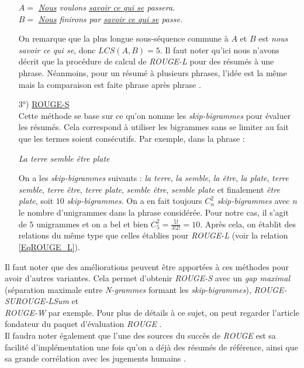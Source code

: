 \begin{itemize}
\begin{center}
$ A =  $ \textit{\underline{Nous} voulons \underline{savoir ce qui se} passera.}\\
$ B =  $ \textit{\underline{Nous} finirons par \underline{savoir ce qui se} passe.}
\end{center}
On remarque que la plus longue sous-séquence commune à $ A $ et $ B $ est \textit{nous savoir ce qui se}, donc $ LCS(A,B) = 5 $. Il faut noter qu'ici nous n'avons décrit que la procédure de calcul de \textit{ROUGE-L} pour des résumés à une phrase. Néanmoins, pour un résumé à plusieurs phrases, l'idée est la même mais la comparaison est faite phrase après phrase \cite{lin2004rouge}.
\item[3°)] \underline{ROUGE-S}\\
Cette méthode se base sur ce qu'on nomme les \textit{skip-bigrammes} pour évaluer les résumés. Cela correspond à utiliser les bigrammes sans se limiter au fait que les termes soient consécutifs. Par exemple, dans la phrase : 
\begin{center}
\textit{La terre semble être plate}
\end{center}
On a les \textit{skip-bigrammes} suivants : \textit{la terre}, \textit{la semble}, \textit{la être}, \textit{la plate}, \textit{terre semble}, \textit{terre être}, \textit{terre plate}, \textit{semble être}, \textit{semble plate} et finalement \textit{être plate}, soit $ 10 $ \textit{skip-bigrammes}. On a en fait toujours $ C_{n}^{2} $ \textit{skip-bigrammes} avec $ n $ le nombre d'unigrammes dans la phrase considérée. Pour notre cas, il s'agit de $ 5 $ unigrammes et on a bel et bien $ C_{5}^{2}=\frac{5!}{3!2!} = 10 $. Après cela, on établit des relations du même type que celles établies pour \textit{ROUGE-L} (voir la relation  \ref{EqROUGE_L}).
\end{itemize}
Il faut noter que des améliorations peuvent être apportées à ces méthodes pour avoir d'autres variantes. Cela permet d'obtenir \textit{ROUGE-S} avec un \textit{gap maximal} (séparation maximale entre \textit{N-grammes} formant les \textit{skip-bigrammes}), \textit{ROUGE-SU}\textit{ROUGE-LSum} et\\ \textit{ROUGE-W} par exemple. Pour plus de détails à ce sujet, on peut regarder l'article fondateur du paquet d'évaluation \textit{ROUGE} \cite{lin2004rouge}.\\
Il faudra noter également que l'une des sources du succès de \textit{ROUGE} est sa facilité d'im\-plé\-men\-ta\-tion une fois qu'on a déjà des résumés de référence, ainsi que sa grande corrélation avec les jugements humains \cite{lin2004rouge,MaaliMnasri, hong2014repository}.
